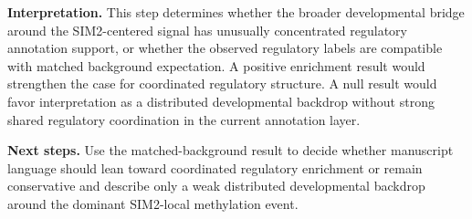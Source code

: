 \textbf{Interpretation.}
This step determines whether the broader developmental bridge around the SIM2-centered signal has unusually concentrated regulatory annotation support, or whether the observed regulatory labels are compatible with matched background expectation. A positive enrichment result would strengthen the case for coordinated regulatory structure. A null result would favor interpretation as a distributed developmental backdrop without strong shared regulatory coordination in the current annotation layer.

\textbf{Next steps.}
Use the matched-background result to decide whether manuscript language should lean toward coordinated regulatory enrichment or remain conservative and describe only a weak distributed developmental backdrop around the dominant SIM2-local methylation event.
